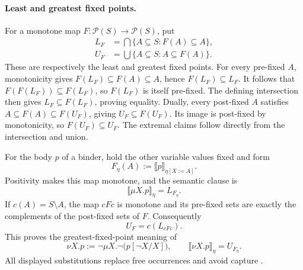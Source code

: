 \paragraph{Least and greatest fixed points.}
For a monotone map \(F:\mathcal P(S)\to\mathcal P(S)\), put
\[
\begin{aligned}
 L_F&=\bigcap\{A\subseteq S:F(A)\subseteq A\},\\
 U_F&=\bigcup\{A\subseteq S:A\subseteq F(A)\}.
\end{aligned}
\]
These are respectively the least and greatest fixed points.
For every pre-fixed \(A\), monotonicity gives
\(F(L_F)\subseteq F(A)\subseteq A\), hence
\(F(L_F)\subseteq L_F\). It follows that
\(F(F(L_F))\subseteq F(L_F)\), so \(F(L_F)\) is itself
pre-fixed. The defining intersection then gives
\(L_F\subseteq F(L_F)\), proving equality.
Dually, every post-fixed \(A\) satisfies
\(A\subseteq F(A)\subseteq F(U_F)\), giving
\(U_F\subseteq F(U_F)\). Its image is post-fixed by
monotonicity, so \(F(U_F)\subseteq U_F\). The extremal
claims follow directly from the intersection and union.

For the body \(p\) of a binder, hold the other variable
values fixed and form
\[
 F_\eta(A):=\llbracket p\rrbracket_{\eta[X:=A]}.
\]
Positivity makes this map monotone, and the semantic
clause is
\[
 \llbracket\mu X.p\rrbracket_\eta=L_{F_\eta}.
\]
If \(c(A)=S\setminus A\), the map \(cFc\) is monotone
and its pre-fixed sets are exactly the complements of
the post-fixed sets of \(F\). Consequently
\[
 U_F=c(L_{cFc}).
\]
This proves the greatest-fixed-point meaning of
\[
 \nu X.p:=\neg\mu X.\neg\bigl(p[\neg X/X]\bigr),
 \qquad
 \llbracket\nu X.p\rrbracket_\eta=U_{F_\eta}.
\]
All displayed substitutions replace free occurrences
and avoid capture \cite[pp.~334--336]{Kozen1983}.

